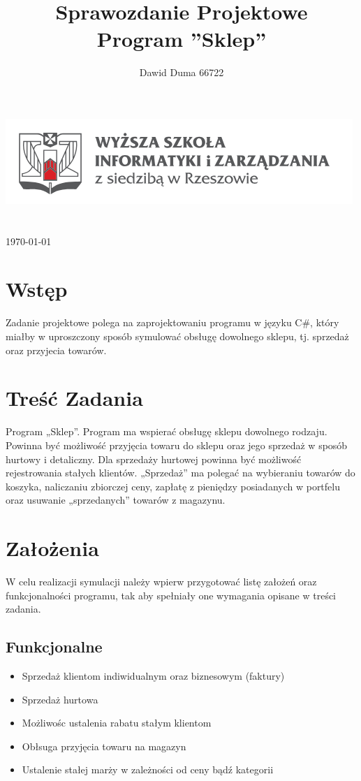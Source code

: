 \documentclass[12pt,a4paper]{article}
\title{Sprawozdanie Projektowe \\ Program ''Sklep''}
\author{Dawid Duma 66722}
\begin{document}
\makeatletter
    \begin{titlepage}
        \begin{center}
            \includegraphics[width=0.7\linewidth]{figures/logoWSIiZ.png}\\[4ex]
            {\huge \bfseries  \@title }\\[2ex] 
            {\LARGE  \@author}\\[50ex] 
            {\large \today}
        \end{center}
    \end{titlepage}
\makeatother
\thispagestyle{empty}
\newpage

\tableofcontents
\newpage

\section{Wstęp}
Zadanie projektowe polega na zaprojektowaniu programu w języku C\#, który miałby w uproszczony sposób symulować obsługę dowolnego sklepu, tj. sprzedaż oraz przyjecia towarów.

\section{Treść Zadania}
Program „Sklep”. Program ma wspierać obsługę sklepu dowolnego rodzaju. Powinna być możliwość przyjęcia towaru do sklepu oraz jego sprzedaż w sposób hurtowy i detaliczny. Dla sprzedaży hurtowej powinna być możliwość rejestrowania stałych klientów. „Sprzedaż” ma polegać na wybieraniu towarów do koszyka, naliczaniu zbiorczej ceny, zapłatę z pieniędzy posiadanych w portfelu oraz usuwanie „sprzedanych” towarów z magazynu.

\section{Założenia}
W celu realizacji symulacji należy wpierw przygotować listę założeń oraz funkcjonalności programu, tak aby spełniały one wymagania opisane w treści zadania.
	\subsection{Funkcjonalne}
	\begin{itemize}
		\item Sprzedaż klientom indiwidualnym oraz biznesowym (faktury)
		\item Sprzedaż hurtowa 
		\item Możliwośc ustalenia rabatu stałym klientom
		\item Obłsuga przyjęcia towaru na magazyn
		\item Ustalenie stałej marży w zależności od ceny bądź kategorii
	\end{itemize}
	
\end{document}
